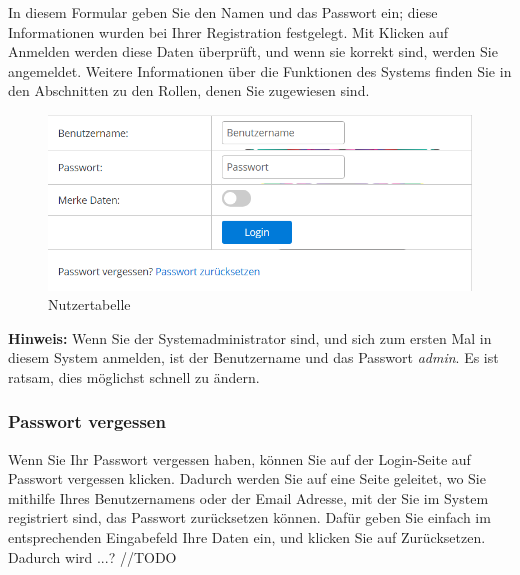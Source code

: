 \documentclass[enabledeprecatedfontcommands,fontsize=12pt,paper=a4,twoside]{scrartcl}
\begin{document}
In diesem Formular geben Sie den Namen und das Passwort ein; diese Informationen wurden bei Ihrer Registration festgelegt. Mit Klicken auf Anmelden werden diese Daten überprüft, und wenn sie korrekt sind, werden Sie angemeldet. Weitere Informationen über die Funktionen des Systems finden Sie in den Abschnitten zu den Rollen, denen Sie zugewiesen sind. \\

\begin{figure}[h!]
\begin{center}
 \includegraphics[width=\textwidth]{screenshots/allgemein/login.png}
  \caption{Nutzertabelle}
  \label{fig:boat1}
\end{center}
\end{figure}

\textbf{Hinweis:} Wenn Sie der Systemadministrator sind, und sich zum ersten Mal in diesem System anmelden, ist der Benutzername und das Passwort \textit{admin}. Es ist ratsam, dies möglichst schnell zu ändern. \\


\subsubsection{Passwort vergessen}
Wenn Sie Ihr Passwort vergessen haben, können Sie auf der Login-Seite auf Passwort vergessen klicken. Dadurch werden Sie auf eine Seite geleitet, wo Sie mithilfe Ihres Benutzernamens oder der Email Adresse, mit der Sie im System registriert sind, das Passwort zurücksetzen können. Dafür geben Sie einfach im entsprechenden Eingabefeld Ihre Daten ein, und klicken Sie auf Zurücksetzen. Dadurch wird ...? //TODO
\end{document}
